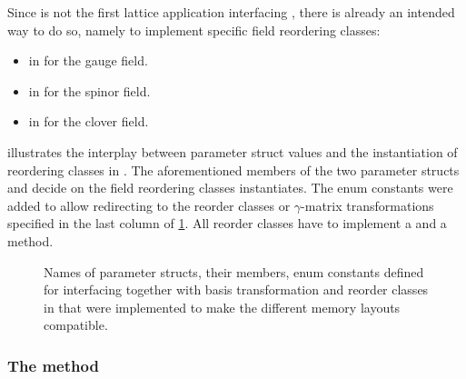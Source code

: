 Since \openqxd is not the first lattice application interfacing \quda, there is already an intended way to do so, namely to implement specific field reordering classes\cite{QUDApaper}:
\begin{itemize}
  \item {} in  for the gauge field.
  \item {} in  for the spinor field.
  \item {} in  for the clover field.
\end{itemize}
 illustrates the interplay between parameter struct values and the instantiation of reordering classes in \quda.
The aforementioned members of the two parameter structs  and  decide on the field reordering classes \quda instantiates.
The enum constants were added to allow redirecting to the \openqxd reorder classes or $\gamma$-matrix transformations specified in the last column of \cref{fig:reorder_interface}.
All reorder classes have to implement a  and a  method.
\begin{figure}
  
  \caption{Names of parameter structs, their members, enum constants defined for interfacing \openqxd together with basis transformation and reorder classes in \quda that were implemented to make the different memory layouts compatible.}
  \label{fig:reorder_interface}
\end{figure}

\subsubsection{The  method}

